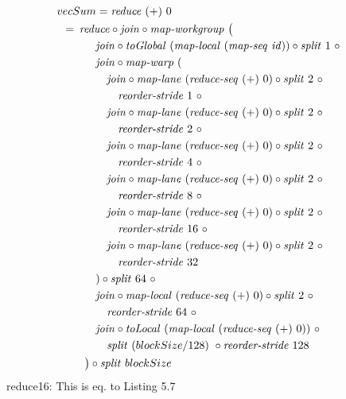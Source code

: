 \begin{align}
  &\hspace{-1.5em}vecSum = \reduce\ (+)\ 0\nonumber\\
  &\hspace{-2em}\quad\begin{aligned}
    &=\hspace{.2em}
      \reduce \circ \join \circ \mapWorkgroup\ \big(\\
    &\qquad\quad \join \circ \toGlobal\ (\mapLocal\ (\mapSeq\ \id)) \circ \splitN\ 1\ \circ\\
    &\qquad\quad \join \circ \mapWarp\ (\\
    &\qquad\qquad \join \circ \mapLane\ (\reduceSeq\ (+)\ 0) \circ \splitN\ 2\ \circ\\
    &\qquad\qquad\quad \reorderStride\ 1\ \circ\\
    &\qquad\qquad \join \circ \mapLane\ (\reduceSeq\ (+)\ 0) \circ \splitN\ 2\ \circ\\
    &\qquad\qquad\quad \reorderStride\ 2\ \circ\\
    &\qquad\qquad \join \circ \mapLane\ (\reduceSeq\ (+)\ 0) \circ \splitN\ 2\ \circ\\
    &\qquad\qquad\quad \reorderStride\ 4\ \circ\\
    &\qquad\qquad \join \circ \mapLane\ (\reduceSeq\ (+)\ 0) \circ \splitN\ 2\ \circ\\
    &\qquad\qquad\quad \reorderStride\ 8\ \circ\\
    &\qquad\qquad \join \circ \mapLane\ (\reduceSeq\ (+)\ 0) \circ \splitN\ 2\ \circ\\
    &\qquad\qquad\quad \reorderStride\ 16\ \circ\\
    &\qquad\qquad \join \circ \mapLane\ (\reduceSeq\ (+)\ 0) \circ \splitN\ 2\ \circ\\
    &\qquad\qquad\quad \reorderStride\ 32\\
    &\qquad\quad) \circ \splitN\ 64\ \circ\\
    &\qquad\quad \join \circ \mapLocal\ (\reduceSeq\ (+)\ 0) \circ \splitN\ 2\ \circ\\
    &\qquad\qquad \reorderStride\ 64\ \circ\\
    &\qquad\quad \join \circ \toLocal\ (\mapLocal\ (\reduceSeq\ (+)\ 0))\ \circ\\
    &\qquad\qquad\splitN\ (blockSize/128)\ \circ \reorderStride\ 128\\
    &\qquad\big) \circ \splitN\ blockSize
  \end{aligned}
\end{align}
reduce16: This is eq. to Listing 5.7





















